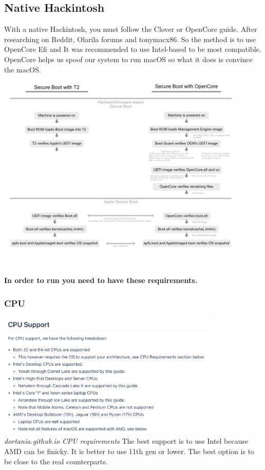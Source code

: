 \documentclass[12pt, letterpaper]{article}
\begin{document}
\subsection{Native Hackintosh}
With a native Hackintosh, you must follow the Clover or OpenCore guide. After researching on Reddit, Olarila forums and tonymacx86. So the method is to use OpenCore Efi and It was recommended to use Intel-based to be most compatible.
\hfill\break
\hfill\break
OpenCore helps us spoof our system to run macOS so what it does is convince the macOS.
\hfill\break
\hfill\break
\includegraphics[width=0.9\textwidth]{fotos/PSP/Research/Native/Opencore Erik tekening.png}

\hfill\break
\hfill\break
\textbf{In order to run you need to have these requirements.}
\subsubsection{CPU}
\includegraphics[width=0.8\textwidth]{fotos/PSP/Research/Native/Open core req cpu.jpeg}
\break
\emph{dortania.github.io CPU requirements}
\hfill\break
\hfill\break
The best support is to use Intel because AMD can be finicky. It is better to use 11th gen or lower. The best option is to be close to the real counterparts.
\hfill\break
\hfill\break
\end{document}
